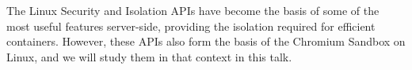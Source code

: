 \def\abstracttitle{Linux Security APIs and the Chromium Sandbox}
\def\abstractcomment{Regular Talk}
\def\abstractowner{Patricia Aas}

\thispagestyle{abstract}

The Linux Security and Isolation APIs have become the basis of some of the most useful features server-side, providing the isolation required for efficient containers. However, these APIs also form the basis of the Chromium Sandbox on Linux, and we will study them in that context in this talk.
